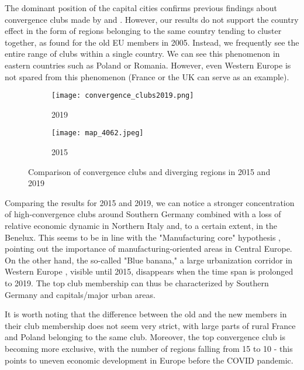 \documentclass[11pt]{article}
\begin{document}
The dominant position of the capital cities confirms previous findings about convergence clubs made by \citet{sme2012regional} and \citet{bartkowska2012regional}. However, our results do not support the country effect in the form of regions belonging to the same country tending to cluster together, as \citet{bartkowska2012regional} found for the old EU members in 2005. Instead, we frequently see the entire range of clubs within a single country. We can see this phenomenon in eastern countries such as Poland or Romania. However,
even Western Europe is not spared from this phenomenon (France or the UK can serve as an example).


\begin{figure}[!htbp]%
\centering
\begin{subfigure}[c]{0.75\linewidth}
  {
  \texttt{[image: convergence\_clubs2019.png]}
    \caption{2019}
    \label{clubs_graphic_2019}
  }
\end{subfigure}
\qquad
\begin{subfigure}[c]{0.75\linewidth}
  \texttt{[image: map\_4062.jpeg]}
  \caption{2015}
  \label{clubs_graphic_2015}
\end{subfigure}
  \caption{Comparison of convergence clubs and diverging regions in 2015 and 2019}
\label{clubs_graphic}
\end{figure} 


Comparing the results for 2015 and 2019, we can notice a stronger concentration of high-convergence clubs around Southern Germany combined with a loss of relative economic dynamic in Northern Italy and, to a certain extent, in the Benelux. This seems to be in line with the "Manufacturing core" hypothesis \citep{cutrini2019economic, stollinger2016structural}, pointing out the importance of manufacturing-oriented areas in Central Europe. On the other hand, the so-called "Blue banana," a large urbanization corridor in Western Europe \citep{hospers2002beyond}, visible until 2015, disappears when the time span is prolonged to 2019. The top club membership can thus be characterized by Southern Germany and capitals/major urban areas.

It is worth noting that the difference between the old and the new members in their club membership does not seem very strict, with large parts of rural France and Poland belonging to the same club. Moreover, the top convergence club is becoming more exclusive, with the number of regions falling from 15 to 10 - this points to uneven economic development in Europe before the COVID pandemic.
\end{document}
